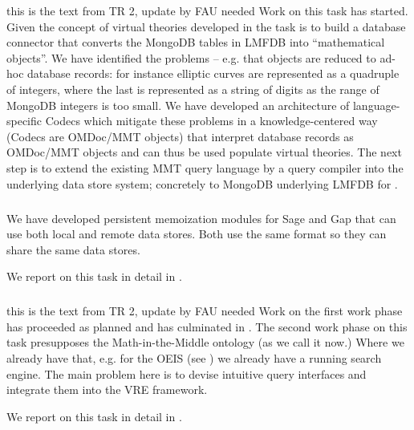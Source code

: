\begin{oldpart}{this is the text from TR 2, update by FAU needed}
Work on this task has started. Given the concept of virtual theories developed in  the task is to build a database connector that converts the MongoDB tables in LMFDB into ``mathematical objects''.
We have identified the problems -- e.g. that objects are reduced to ad-hoc database records: for instance elliptic curves are represented as a quadruple of integers, where the last is represented as a string of digits as the range of MongoDB integers is too small.
We have developed an architecture of language-specific Codecs which mitigate these problems in a knowledge-centered way (Codecs are OMDoc/MMT objects) that interpret database records as OMDoc/MMT objects and can thus be used populate virtual theories.
The next step is to extend the existing MMT query language by a query compiler into the underlying data store system; concretely to MongoDB underlying LMFDB for .
\end{oldpart}
\medskip

\subparagraph{}
\label{dksbases@data-memo}
We have developed persistent memoization modules for Sage and Gap that can use both local and remote data stores.
Both use the same format so they can share the same data stores.

We report on this task in detail in .
\medskip

\subparagraph{}
\begin{oldpart}{this is the text from TR 2, update by FAU needed}
Work on the first work phase has proceeded as planned and has culminated in .
The second work phase on this task presupposes the Math-in-the-Middle ontology (as we call it now.)
Where we already have that, e.g. for the OEIS (see ) we already have a running search engine.
The main problem here is to devise intuitive query interfaces and integrate them into the \pn VRE framework.
\end{oldpart}

We report on this task in detail in .
\medskip


